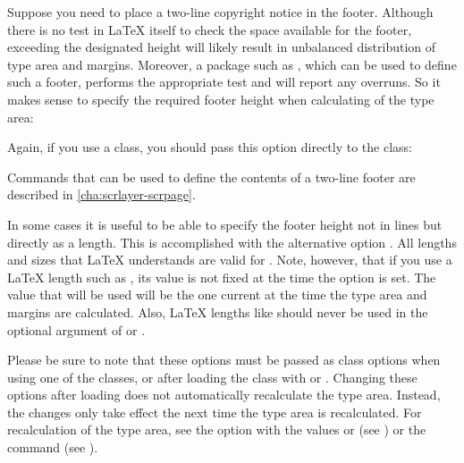 \begin{Example}
  Suppose you need to place a two-line copyright notice in the footer.
  Although there is no test in \LaTeX{} itself to check the space available
  for the footer, exceeding the designated height will likely result in
  unbalanced distribution of type area and margins. Moreover, a package such
  as \hyperref[cha:scrlayer-scrpage]{}%
  , which can be used to define such a footer,
  performs the appropriate test and will report any overruns. So it makes
  sense to specify the required footer height when calculating of the type
  area:
  Again, if you use a \KOMAScript{} class, you should pass this
  option directly to the class:
  Commands that can be used to define the contents of a two-line footer
  are described in \autoref{cha:scrlayer-scrpage}.
\end{Example}

In some cases it is useful to be able to specify the footer height not in
lines but directly as a length. This is accomplished with the alternative
option . All lengths and
sizes that \LaTeX{} understands are valid for . Note, however,
that if you use a \LaTeX{} length such as , its value is
not fixed at the time the option is set. The value that will be used will be
the one current at the time the type area and margins are calculated.
Also, \LaTeX{} lengths like  should
never be used in the optional argument of
 or .

Please be sure to note that these options must be passed
as class options when using one of the {\KOMAScript} classes, or after loading
the class with  or
. Changing these options after loading
 does not automatically
recalculate the type area. Instead, the changes only take effect the next time
the type area is recalculated. For recalculation of the type area, see the
\hyperref[desc:\LabelBase.option.DIV.last]{} option with the
values \hyperref[desc:\LabelBase.option.DIV.last]{} or
\hyperref[desc:\LabelBase.option.DIV.current]{} (see
) or the
 command (see
).%
\EndIndexGroup


